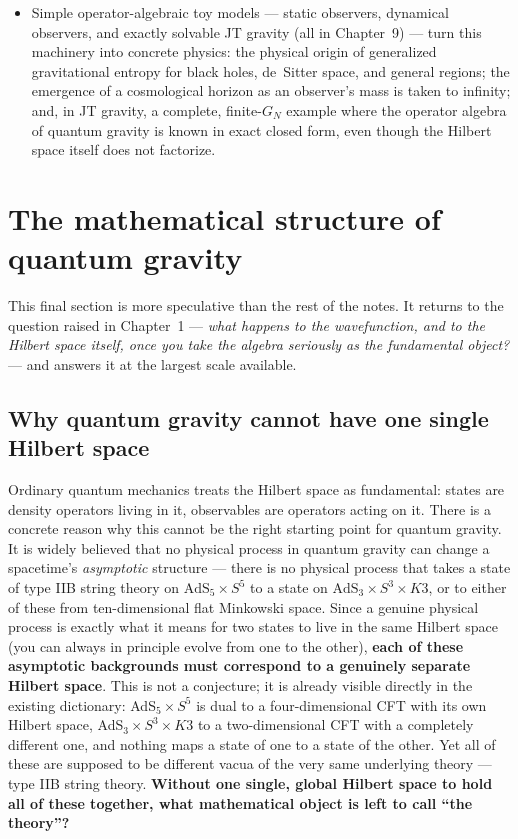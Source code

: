 \begin{itemize}
Einstein regime — and both constructions apply just as well to non-gravitational systems entangled with a
holographic partner (Chapter~7), with no need for the non-gravitational side to have its own large-$N$
parameter at all.
\item Simple operator-algebraic toy models — static observers, dynamical observers, and exactly solvable JT
gravity (all in Chapter~9) — turn this machinery into concrete physics: the physical origin of generalized
gravitational entropy for black holes, de~Sitter space, and general regions; the emergence of a cosmological
horizon as an observer's mass is taken to infinity; and, in JT gravity, a complete, finite-$G_N$ example where
the operator algebra of quantum gravity is known in exact closed form, even though the Hilbert space itself
does not factorize.
\end{itemize}

\section{The mathematical structure of quantum gravity}

This final section is more speculative than the rest of the notes. It returns to the question raised in
Chapter~1 — \emph{what happens to the wavefunction, and to the Hilbert space itself, once you take the algebra
seriously as the fundamental object?} — and answers it at the largest scale available.

\subsection*{Why quantum gravity cannot have one single Hilbert space}

Ordinary quantum mechanics treats the Hilbert space as fundamental: states are density operators living in it,
observables are operators acting on it. There is a concrete reason why this cannot be the right starting point
for quantum gravity. It is widely believed that no physical process in quantum gravity can change a
spacetime's \emph{asymptotic} structure — there is no physical process that takes a state of type IIB string
theory on $\text{AdS}_5\times S^5$ to a state on $\text{AdS}_3\times S^3\times K3$, or to either of these from
ten-dimensional flat Minkowski space. Since a genuine physical process is exactly what it means for two states
to live in the same Hilbert space (you can always in principle evolve from one to the other), \textbf{each of
these asymptotic backgrounds must correspond to a genuinely separate Hilbert space}. This is not a conjecture;
it is already visible directly in the existing dictionary: AdS$_5\times S^5$ is dual to a four-dimensional CFT
with its own Hilbert space, AdS$_3\times S^3\times K3$ to a two-dimensional CFT with a completely different
one, and nothing maps a state of one to a state of the other. Yet all of these are supposed to be different
vacua of the very same underlying theory — type IIB string theory. \textbf{Without one single, global Hilbert
space to hold all of these together, what mathematical object is left to call ``the theory''?}

